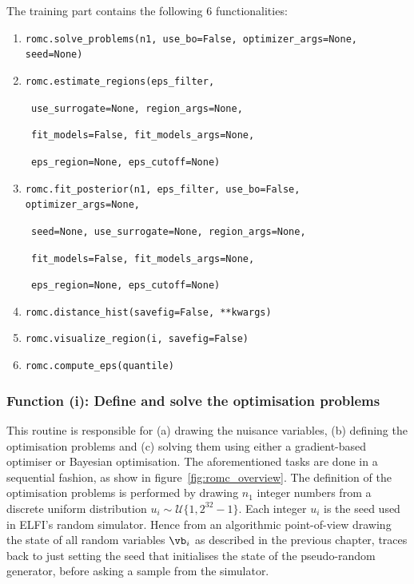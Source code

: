 The training part contains the following 6 functionalities:

\begin{enumerate}
\item \texttt{romc.solve_problems(n1, use_bo=False, optimizer_args=None, seed=None)}
\item \texttt{romc.estimate_regions(eps_filter,}
  
      \texttt{                      use_surrogate=None, region_args=None,}
  
      \texttt{                      fit_models=False, fit_models_args=None,}
  
      \texttt{                      eps_region=None, eps_cutoff=None)}
      
    \item \texttt{romc.fit_posterior(n1, eps_filter, use_bo=False, optimizer_args=None,}
  
          \texttt{                   seed=None, use_surrogate=None, region_args=None,}
  
          \texttt{                   fit_models=False, fit_models_args=None,}
  
          \texttt{                   eps_region=None, eps_cutoff=None)}

\item \texttt{romc.distance_hist(savefig=False, **kwargs)}
\item \texttt{romc.visualize_region(i, savefig=False)}
\item \texttt{romc.compute_eps(quantile)}
\end{enumerate}


\subsubsection*{Function (i): Define and solve the optimisation problems}

\vspace{5mm}

\noindent
This routine is responsible for (a) drawing the nuisance variables,
(b) defining the optimisation problems and (c) solving them using either a
gradient-based optimiser or Bayesian optimisation. The aforementioned
tasks are done in a sequential fashion, as show in
figure~\ref{fig:romc_overview}. The definition of the optimisation
problems is performed by drawing $n_1$ integer numbers from a discrete
uniform distribution $u_i \sim \mathcal{U}\{1, 2^{32}-1\}$. Each
integer $u_i$ is the seed used in ELFI's random simulator. Hence from
an algorithmic point-of-view drawing the state of all random
variables $\vb_i$ as described in the previous chapter, traces back to
just setting the seed that initialises the state of the pseudo-random
generator, before asking a sample from the simulator.

